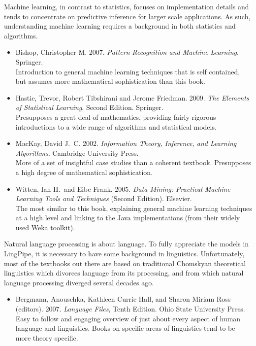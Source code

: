 
\noindent
Machine learning, in contrast to statistics, focuses on implementation
details and tends to concentrate on predictive inference for larger
scale applications.  As such, understanding machine learning requires
a background in both statistics and algorithms.

\begin{itemize}
\item
Bishop, Christopher M.
2007.
{\it Pattern Recognition and Machine Learning}.
Springer.
\\
{\footnotesize Introduction to general machine learning
techniques that is self contained, but assumes more mathematical
sophistication than this book.}
%
\item
Hastie, Trevor, Robert Tibshirani and Jerome Friedman.
2009.
{\it The Elements of Statistical Learning}, Second Edition.
Springer.
\\
{\footnotesize Presupposes a great deal of mathematics, providing
fairly rigorous introductions to a wide range of algorithms and
statistical models.}
%
\item
MacKay, David J.~C.
2002.
{\it Information Theory, Inference, and Learning Algorithms}.
Cambridge University Press.
\\
{\footnotesize More of a set of insightful case studies than a coherent textbook.
Presupposes a high degree of mathematical sophistication.}
%
\item 
Witten, Ian H.\ and Eibe Frank. 2005. {\it Data Mining: Practical
Machine Learning Tools and Techniques} (Second Edition).  Elsevier.
\\
{\footnotesize The most similar to this book, explaining general machine
learning techniques at a high level and 
linking to the Java implementations (from their widely used Weka toolkit).}
%
\end{itemize}





\noindent
Natural language processing is about language.  To fully appreciate
the models in LingPipe, it is necessary to have some background in
linguistics.  Unfortunately, most of the textbooks out there are based
on traditional Chomskyan theoretical linguistics which divorces
language from its processing, and from which natural language
processing diverged several decades ago.

\begin{itemize}
%
\item Bergmann, Anouschka, Kathleen Currie Hall, and Sharon Miriam Ross (editors).
2007.
{\it Language Files}, Tenth Edition.
Ohio State University Press.
\\
{\footnotesize Easy to follow and engaging overview of just about every
aspect of human language and linguistics.  Books on specific areas of
linguistics tend to be more theory specific.}
%
\end{itemize}


